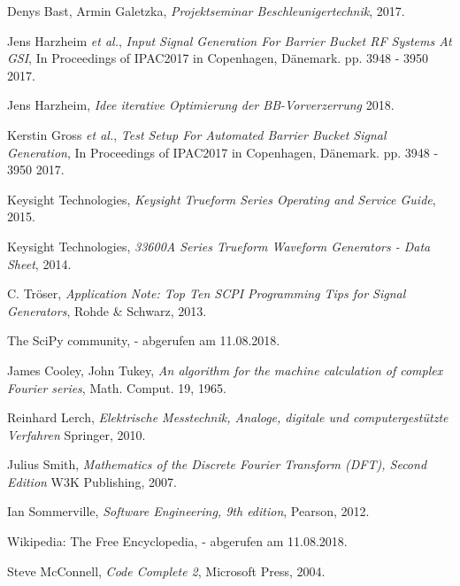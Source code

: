 \documentclass[../Report.tex]{subfiles}
\begin{document}


\begin{thebibliography}{9}
  
	Denys Bast, Armin Galetzka, 
	\textit{Projektseminar Beschleunigertechnik},
	2017.
 
	Jens Harzheim \textit{et al.}, 
	\textit{Input Signal Generation For Barrier Bucket RF Systems At GSI}, In Proceedings of IPAC2017 in Copenhagen, Dänemark. 
	pp. 3948 - 3950
	2017.

	Jens Harzheim,
	\textit{Idee iterative Optimierung der BB-Vorverzerrung}
	2018.
	
	Kerstin Gross \textit{et al.},
	\textit{Test Setup For Automated Barrier Bucket Signal Generation},
	In Proceedings of IPAC2017 in Copenhagen, Dänemark. 
	pp. 3948 - 3950
	2017.
	
	Keysight Technologies,
	\textit{Keysight Trueform Series Operating and Service Guide},
	2015.

	Keysight Technologies,
	\textit{33600A Series Trueform Waveform Generators - Data Sheet},
	2014.
	
	C. Tröser, 
	\textit{Application Note: Top Ten SCPI Programming Tips for Signal Generators},
	Rohde \& Schwarz,
	2013.
	
	The SciPy community,
	- abgerufen am 11.08.2018.
	
	James Cooley, John Tukey,
	\textit{An algorithm for the machine calculation of complex Fourier series},
	Math. Comput. 19,
	1965.
	
	Reinhard Lerch,
	\textit{Elektrische Messtechnik, Analoge, digitale und computergestützte Verfahren}
	Springer,
	2010.

	Julius Smith,	
	\textit{Mathematics of the Discrete Fourier Transform (DFT), Second Edition}
	W3K Publishing, 
	2007.

	
	Ian Sommerville,
	\textit{Software Engineering, 9th edition},
	Pearson,
	2012.
	
	Wikipedia: The Free Encyclopedia,	
	- abgerufen am 11.08.2018. 
	
	Steve McConnell,
	\textit{Code Complete 2},
	Microsoft Press,	
	2004. 
	

\end{thebibliography}
\end{document}
